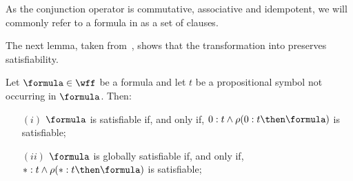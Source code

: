 As the conjunction operator is commutative, associative and idempotent, we will
commonly refer to a formula in  as a set of clauses.

The next lemma, taken from~\cite{nalon2015modal}, shows that the transformation
into  preserves satisfiability.

\begin{lemma}
    Let $\formula \in \wff$ be a formula and let $t$ be a propositional symbol
    not occurring in $\formula$. Then: 
    \begin{enumerate}
        \item[$(i)$] $\formula$ is satisfiable if, and only if, $0 : t \land \rho(0 : t \then \formula)$ is satisfiable;
        \item[$(ii)$] $\formula$ is globally satisfiable if, and only if, $* : t \land \rho(* : t \then \formula)$ is satisfiable;
    \end{enumerate}
\end{lemma}

\begin{example}
    
\end{example}
